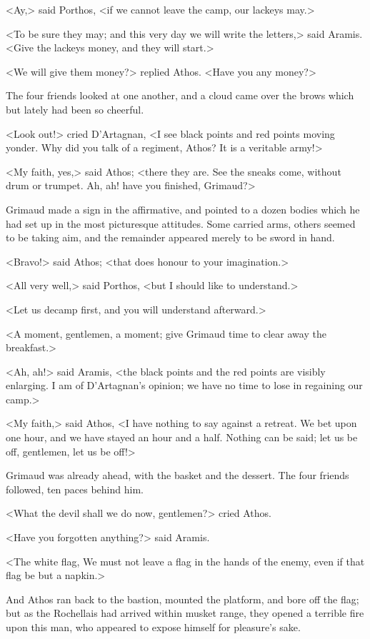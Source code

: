 <Ay,> said Porthos, <if we cannot leave the camp, our lackeys may.> 

<To be sure they may; and this very day we will write the letters,> said Aramis. <Give the lackeys money, and they will start.> 

<We will give them money?> replied Athos. <Have you any money?> 

The four friends looked at one another, and a cloud came over the brows which but lately had been so cheerful. 

<Look out!> cried D'Artagnan, <I see black points and red points moving yonder. Why did you talk of a regiment, Athos? It is a veritable army!> 

<My faith, yes,> said Athos; <there they are. See the sneaks come, without drum or trumpet. Ah, ah! have you finished, Grimaud?> 

Grimaud made a sign in the affirmative, and pointed to a dozen bodies which he had set up in the most picturesque attitudes. Some carried arms, others seemed to be taking aim, and the remainder appeared merely to be sword in hand. 

<Bravo!> said Athos; <that does honour to your imagination.> 

<All very well,> said Porthos, <but I should like to understand.> 

<Let us decamp first, and you will understand afterward.> 

<A moment, gentlemen, a moment; give Grimaud time to clear away the breakfast.> 

<Ah, ah!> said Aramis, <the black points and the red points are visibly enlarging. I am of D'Artagnan's opinion; we have no time to lose in regaining our camp.> 

<My faith,> said Athos, <I have nothing to say against a retreat. We bet upon one hour, and we have stayed an hour and a half. Nothing can be said; let us be off, gentlemen, let us be off!> 

Grimaud was already ahead, with the basket and the dessert. The four friends followed, ten paces behind him. 

<What the devil shall we do now, gentlemen?> cried Athos. 

<Have you forgotten anything?> said Aramis. 

<The white flag,  We must not leave a flag in the hands of the enemy, even if that flag be but a napkin.> 

And Athos ran back to the bastion, mounted the platform, and bore off the flag; but as the Rochellais had arrived within musket range, they opened a terrible fire upon this man, who appeared to expose himself for pleasure's sake. 

